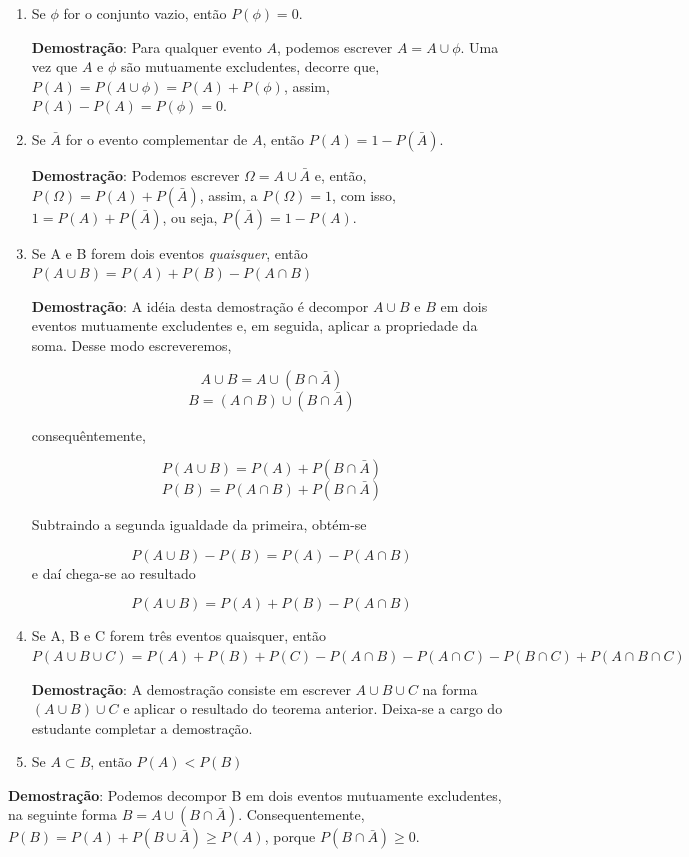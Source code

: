 \begin{enumerate}
    \item Se $\phi$ for o conjunto vazio, então
    $P(\phi)=0$.

\textbf{Demostração}: Para qualquer evento $A$, podemos escrever
$A=A\cup \phi$. Uma vez que $A$ e $\phi$ são mutuamente
excludentes, decorre que, $P(A)=P(A\cup \phi)= P(A)+P(\phi)$,
assim, $P(A)- P(A)= P(\phi)= 0$.
    \item Se $\bar{A}$ for o evento complementar de $A$, então
    $P(A)=1-P(\bar{A})$.

\textbf{Demostração}: Podemos escrever $\Omega = A \cup \bar{A}$
e, então, $P(\Omega)= P(A)+ P(\bar{A})$, assim, a $P(\Omega)=1$,
com isso, $1= P(A)+P(\bar{A})$, ou seja, $P(\bar{A})= 1- P(A)$.
    \item Se A e B forem dois eventos \emph{quaisquer}, então $P(A\cup B)=P(A)+P(B)-P(A\cap B)$

\textbf{Demostração}: A idéia desta demostração é decompor $A\cup
B$ e $B$ em dois eventos mutuamente excludentes e, em seguida,
aplicar a propriedade da soma. Desse modo escreveremos,

$$A \cup B= A\cup (B\cap \bar{A})$$
$$B= (A \cap B) \cup (B\cap \bar{A})$$

consequêntemente,

$$P(A \cup B)= P(A)+P(B \cap \bar{A})$$
$$ P(B) = P(A \cap B) + P(B \cap \bar{A})$$

Subtraindo a segunda igualdade da primeira, obtém-se

$$ P(A \cup B) - P(B) = P(A)- P(A \cap B)$$
 e daí chega-se ao resultado

$$ P(A \cup B) = P(A)+P(B)- P(A \cap B)$$
    \item Se A, B e C forem três eventos quaisquer, então $P(A \cup B \cup C) = P(A)+P(B)+P(C)-P(A\cap B)-P(A\cap C)-P(B\cap C)+P(A\cap B \cap C)$


\textbf{ \maltese Demostração}: A demostração consiste em escrever
$A \cup B \cup C$ na forma $(A \cup B)\cup C$ e aplicar o
resultado do teorema anterior. Deixa-se a cargo do estudante
completar a demostração.

    \item Se $A \subset B$, então $P(A) < P(B)$
\end{enumerate}

\textbf{Demostração}: Podemos decompor B em dois eventos
mutuamente excludentes, na seguinte forma $B = A \cup (B \cap
\bar{A})$. Consequentemente, $P(B) = P(A)+ P(B \cup \bar{A}) \geq
P(A)$, porque $P(B \cap \bar{A}) \geq 0$.


